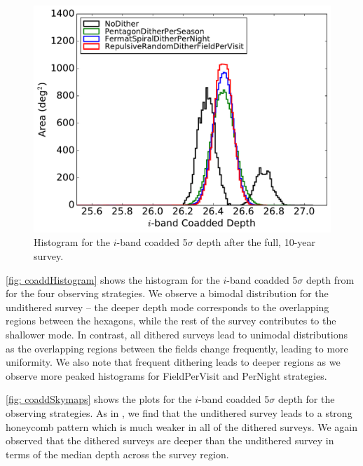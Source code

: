 \begin{figure}[!htb]
      \centering\hspace*{-3em}\includegraphics[width=0.6\linewidth]{figs/awan_coaddHistogram.pdf}
      \vspace*{-1em}
\caption{Histogram for the $i$-band coadded 5$\sigma$ depth after the full, 10-year survey.}
\label{fig: coaddHistogram}
\end{figure}

\autoref{fig: coaddHistogram} shows the histogram for the $i$-band coadded 5$\sigma$ depth from  for the four observing strategies. We observe a bimodal distribution for the undithered survey -- the deeper depth mode corresponds to the overlapping regions between the hexagons, while the rest of the survey contributes to the shallower mode. In contrast, all dithered surveys lead to unimodal distributions as the overlapping regions between the fields change frequently, leading to more uniformity. We also note that frequent dithering leads to deeper regions as we observe more peaked histograms for FieldPerVisit and PerNight strategies.

\autoref{fig: coaddSkymaps} shows the plots for the $i$-band coadded 5$\sigma$ depth for the observing strategies. As in \citet{AwanEtal2016}, we find that the undithered survey leads to a strong honeycomb pattern which is much weaker in all of the dithered surveys. We again observed that the dithered surveys are deeper than the undithered survey in terms of the median depth across the survey region.

